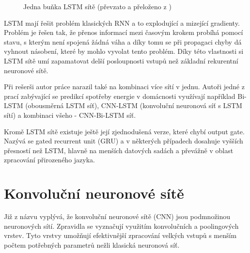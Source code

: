 \documentclass[FM,BP,fonts]{tulthesis}
\begin{document}
\begin{figure}[htbp]
	\centering
	\caption{Jedna buňka LSTM sítě (převzato a přeloženo z \cite{colah})}
	\label{fig:my_graph}
\end{figure}

LSTM mají řešit problém klasických RNN a to explodující a mizející gradienty. Problém je řešen tak, že přenos informací mezi časovým krokem probíhá pomocí stavu, s kterým není spojená žádná váha a díky tomu se při propagaci chyby dá vyhnout násobení, které by mohlo vyvolat tento problém. Díky této vlastnosti si LSTM sítě umí zapamatovat delší posloupnosti vstupů než základní rekurentní neuronové sítě.

Při rešerši autor práce narazil také na kombinaci více sítí v jednu. Autoři jedné z prací zabývající se predikcí spotřeby energie v domácnosti \cite{cnn-bi-lstm}	 využívají například Bi-LSTM (obousměrná LSTM síť), CNN-LSTM (konvoluční neuronová síť s LSTM sítí) a kombinaci všeho - CNN-Bi-LSTM síť.

Kromě LSTM sítě existuje ještě její zjednodušená verze, které chybí output gate. Nazývá se gated recurrent unit (GRU) a v některých případech dosahuje vyšších přesností než LSTM, hlavně na menších datových sadách a převážně v oblast zpracování přirozeného jazyka. \cite{kynych2018vyuziti}

\section{Konvoluční neuronové sítě}
Již z názvu vyplývá, že konvoluční neuronové sítě (CNN) jsou podmnožinou neuronových sítí. Zpravidla se vyznačují využitím konvolučních a poolingových vrstev. Tyto vrstvy umožňují efektivnější zpracování velkých vstupů s menším počtem potřebných parametrů nežli klasická neuronová síť. 
\end{document}
